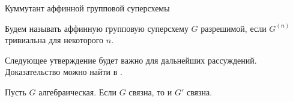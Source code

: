 \begin{subsection}{Куммутант аффинной групповой суперсхемы}
  \begin{definition}
    Будем называть аффинную групповую суперсхему $ G $ разрешимой,
    если $ G^{(n)} $ тривиальна для некоторого $ n $.
  \end{definition}

  Следующее утверждение будет важно для дальнейших рассуждений.
  Доказательство можно найти в \cite{waterhouse}.
  \begin{theorem}
    Пусть $ G $ алгебраическая. Если $ G $ связна, то и $ G' $ связна.
  \end{theorem}

\end{subsection}

